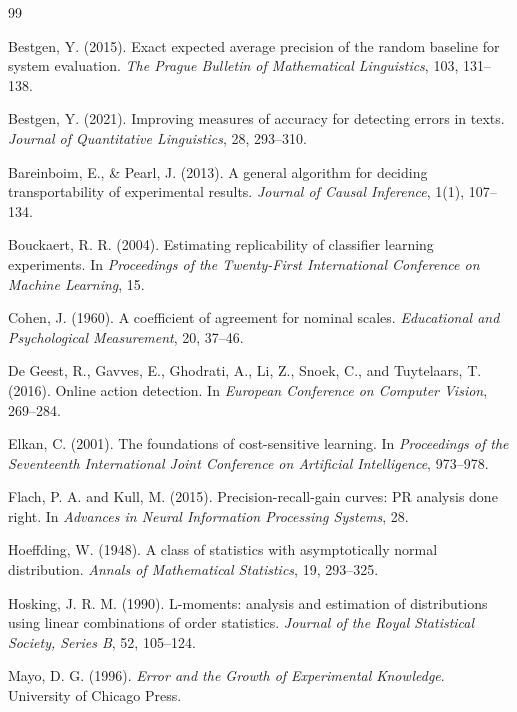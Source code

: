 \documentclass[11pt]{article}
\theoremstyle{remark}
\begin{document}
\begin{thebibliography}{99}

Bestgen, Y. (2015).
Exact expected average precision of the random baseline for system evaluation.
\emph{The Prague Bulletin of Mathematical Linguistics}, 103, 131--138.

Bestgen, Y. (2021).
Improving measures of accuracy for detecting errors in texts.
\emph{Journal of Quantitative Linguistics}, 28, 293--310.

Bareinboim, E., \& Pearl, J. (2013).
A general algorithm for deciding transportability of experimental results.
\emph{Journal of Causal Inference}, 1(1), 107--134.

Bouckaert, R. R. (2004).
Estimating replicability of classifier learning experiments.
In \emph{Proceedings of the Twenty-First International Conference on Machine Learning}, 15.

Cohen, J. (1960).
A coefficient of agreement for nominal scales.
\emph{Educational and Psychological Measurement}, 20, 37--46.

De Geest, R., Gavves, E., Ghodrati, A., Li, Z., Snoek, C., and Tuytelaars, T. (2016).
Online action detection.
In \emph{European Conference on Computer Vision}, 269--284.

Elkan, C. (2001).
The foundations of cost-sensitive learning.
In \emph{Proceedings of the Seventeenth International Joint Conference on Artificial Intelligence}, 973--978.

Flach, P. A. and Kull, M. (2015).
Precision-recall-gain curves: PR analysis done right.
In \emph{Advances in Neural Information Processing Systems}, 28.

Hoeffding, W. (1948).
A class of statistics with asymptotically normal distribution.
\emph{Annals of Mathematical Statistics}, 19, 293--325.

Hosking, J. R. M. (1990).
L-moments: analysis and estimation of distributions using linear combinations of order statistics.
\emph{Journal of the Royal Statistical Society, Series B}, 52, 105--124.

Mayo, D. G. (1996).
\emph{Error and the Growth of Experimental Knowledge}.
University of Chicago Press.


\end{thebibliography}
\end{document}

